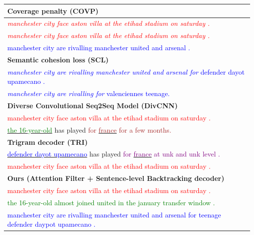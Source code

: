 \begin{table}[th!]
\begin{center}
\begin{tabular}{p{13cm}}
\cmidrule[1pt]{1-1} \bf Coverage penalty (COVP)\\
\hline \textcolor{red}{\textit{manchester city face aston villa at the etihad stadium on saturday .}} \\
      \textcolor{red}{\textit{manchester city face aston villa at the etihad stadium on saturday .}} \\
	   \textcolor{blue}{manchester city are rivalling manchester united and arsenal .}\\
\cmidrule[1pt]{1-1} \bf Semantic cohesion loss (SCL) \\
\hline \textcolor{blue}{\textit{manchester city are rivalling manchester united and arsenal for} defender dayot upamecano .}\\
       \textcolor{blue}{\textit{manchester city are rivalling for} valenciennes teenage.} \\
\cmidrule[1pt]{1-1} \bf Diverse Convolutional Seq2Seq  Model (DivCNN) \\
\hline \textcolor{red}{manchester city face aston villa at the etihad stadium on saturday . } \\
\underline{\textcolor{green}{the 16-year-old}} has played \textcolor{brown}{for} \underline{\textcolor{brown}{france}}  \textcolor{brown}{for a few months.}
\vspace{0.2mm} \\
\cmidrule[1pt]{1-1} \bf Trigram decoder (TRI) \\
\hline \underline{\textcolor{blue}{defender dayot upamecano}} has played \textcolor{purple}{for} \underline{\textcolor{purple}{france}} \textcolor{purple}{at unk and unk level .}\\ 
       \textcolor{red}{manchester city face aston villa at the etihad stadium on saturday .} \\
\cmidrule[1pt]{1-1} \bf Ours (Attention Filter + Sentence-level Backtracking decoder) \\
\hline \textcolor{red}{manchester city face aston villa at the etihad stadium on saturday .} \\
       \textcolor{green}{the 16-year-old almost joined united in the january transfer window .}\\
	   \textcolor{blue}{manchester city are rivalling manchester united and arsenal for teenage defender daypot upamecano .}\\
\bottomrule[1pt]
\end{tabular}
\end{center}
\end{table}


